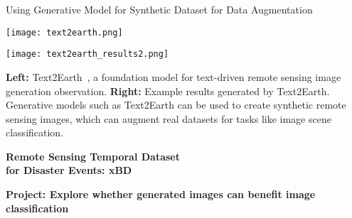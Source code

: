 \begin{refsection}
  \begin{frame}{Using Generative Model for Synthetic Dataset for Data Augmentation}
    \begin{minipage}{0.65\linewidth}
      \centering
      \texttt{[image: text2earth.png]}
      
    \end{minipage}
    \hfill
    \begin{minipage}{0.33\linewidth}
      \centering
      \texttt{[image: text2earth\_results2.png]}
      
    \end{minipage}
    \vspace{1em}
    
    \scriptsize
    \textbf{Left:} Text2Earth~\parencite{text2earth2025}, a foundation model for text-driven remote sensing image generation observation. \textbf{Right:} Example results generated by Text2Earth. 
    Generative models such as Text2Earth can be used to create synthetic remote sensing images, which can augment real datasets for tasks like image scene classification.
    \bottomleftrefs
  \end{frame}
\end{refsection}

\begin{refsection}
  \begin{frame}
    \centering
    \vspace{2.5cm}
    {\LARGE \textbf{Remote Sensing Temporal Dataset}\\[0.5em]
    \textbf{for Disaster Events: xBD}}
  \end{frame}
\end{refsection}



\begin{refsection}
  \begin{frame}
    \centering
    \vspace{2.5cm}
    {\LARGE \textbf{Project: Explore whether generated images can benefit image classification}}
  \end{frame}
\end{refsection}

